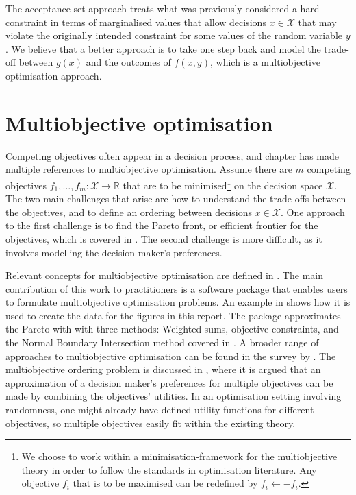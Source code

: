 \documentclass[main.tex]{subfiles}
\begin{document}
The acceptance set approach treats what was previously considered a
hard constraint in terms of marginalised values that allow decisions $x\in\mathcal{X}$
that may violate the originally intended constraint for some values of the random
variable $y$. We believe that a better approach is to take one step back
and model the trade-off between $g(x)$ and the outcomes of $f(x,y)$,
which is a multiobjective optimisation approach.

\section{Multiobjective optimisation}\label{sec:one_multiobjective}

Competing objectives often appear in a decision process, and chapter
has made multiple references to multiobjective optimisation.  Assume
there are $m$ competing objectives
$f_1,\dots,f_m:\mathcal{X}\to\mathbb{R}$ that are to be
minimised\footnote{We choose to work within a minimisation-framework
  for the multiobjective theory in order to follow the standards in
  optimisation literature. Any objective $f_i$ that is to be maximised
  can be redefined by $f_i\leftarrow -f_i$.  } on the decision space
$\mathcal{X}$. The two main challenges that arise are how to understand
the trade-offs between the objectives, and to define an ordering
between decisions $x\in\mathcal{X}$.  One approach to the first
challenge is to find the Pareto front, or efficient
frontier for the objectives, which is covered in
. The second challenge is more difficult,
as it involves modelling the decision maker's preferences.

Relevant concepts for multiobjective optimisation are defined in
.  The main contribution of this work to
practitioners is a software package that enables users to formulate
multiobjective optimisation problems.  An example in
 shows how it is used to create the data for
the figures in this report.  The package approximates the Pareto with
with three methods: Weighted sums, objective
constraints, and the Normal Boundary Intersection method covered in
.  A broader range of
approaches to multiobjective optimisation can be found in the survey
by \citet{marler2004survey}.  The multiobjective ordering problem is
discussed in , where it is argued that an
approximation of a decision maker's preferences for multiple
objectives can be made by combining the objectives' utilities. In an
optimisation setting involving randomness, one might already have
defined utility functions for different objectives, so multiple
objectives easily fit within the existing theory.
\end{document}
